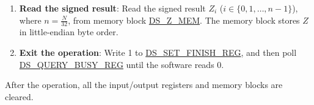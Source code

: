 \documentclass[main\_\_EN.tex]{subfiles}
\begin{document}
\begin{enumerate}
\begin{itemize}
        \item If the value is 1, it indicates that the padding check passes but MD check fails. The signed result \begin{math}Z\end{math} is invalid. The operation will resume directly from Step \ref{other:digsig-step-exit}.
        
        \item If the value is 2, it indicates that the padding check fails but MD check passes. You can continue to get the signed result \begin{math}Z\end{math}. But please note that the data does not comply with the aforementioned PKCS\#7 padding format, which may not be what you want.
        
        \item If the value is 3, it indicates that both padding check and MD check fail. In this case, some fatal errors have occurred and the signed result \begin{math}Z\end{math} is invalid. The operation will resume directly from Step \ref{other:digsig-step-exit}.
        
    \end{itemize}
        
    \item {\bfseries Read the signed result}: Read the signed result \begin{math}Z_{i}\end{math} (\begin{math}i \in \{0,1,\dots,n-1\}\end{math}), where \begin{math} n = \frac{N}{32} \end{math}, from memory block \hyperref[DSZMEM]{DS\_Z\_MEM}. The memory block stores \begin{math}Z\end{math} in little-endian byte order.
    
    \item {\bfseries Exit the operation\label{other:digsig-step-exit}}: Write 1 to \hyperref[regdesc:DSSETFINISHREG]{DS\_SET\_FINISH\_REG}, and then poll \hyperref[regdesc:DSQUERYBUSYREG]{DS\_QUERY\_BUSY\_REG} until the software reads 0.

\end{enumerate}

After the operation, all the input/output registers and memory blocks are cleared.
\end{document}

